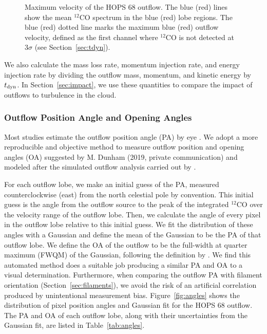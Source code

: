 \documentclass[twocolumn]{aastex63}
\newcommand{\example}{HOPS 68}
\newcommand{\co}[1][]{\ensuremath{^{#1}}CO}
\begin{document}
\begin{figure}
\caption{Maximum velocity of the \example{} outflow. The blue (red) lines show the mean \co[12]{} spectrum in the blue (red) lobe regions. The blue (red) dotted line marks the maximum blue (red) outflow velocity, defined as the first channel where \co[12]{} is not detected at $3\sigma$ (see Section~\ref{sec:tdyn}).\label{fig:vmax}}
\end{figure}

We also calculate the mass loss rate, momentum injection rate, and energy injection rate by dividing the outflow mass, momentum, and kinetic energy by $t_{\rm dyn}$. In Section~\ref{sec:impact}, we use these quantities to compare the impact of outflows to turbulence in the cloud.

\subsubsection{Outflow Position Angle and Opening Angles\label{sec:angles}}
Most studies estimate the outflow position angle (PA) by eye \citep[e.g.][]{Morgan91,Takahashi08,Plunkett13,Stephens17,Kong19,Tanabe:submitted}. We adopt a more reproducible and objective method to measure outflow position and opening angles (OA)  suggested by M. Dunham (2019, private communication) and modeled after the simulated outflow analysis carried out by \citet{Offner11}.

For each outflow lobe, we make an initial guess of the PA, measured counterclockwise (east) from the north celestial pole by convention. This initial guess is the angle from the outflow source to the peak of the integrated \co[12]{} over the velocity range of the outflow lobe. Then, we calculate the angle of every pixel in the outflow lobe relative to this initial guess. We fit the distribution of these angles with a Gaussian and define the mean of the Gaussian to be the PA of that outflow lobe. We define the OA of the outflow to be the full-width at quarter maximum (FWQM) of the Gaussian, following the definition by \cite{Offner11}. We find this automated method does a suitable job producing a similar PA and OA to a visual determination. Furthermore, when comparing the outflow PA with filament orientation (Section~\ref{sec:filaments}), we avoid the risk of an artificial correlation produced by unintentional measurement bias. Figure~\ref{fig:angles} shows the distribution of pixel position angles and Gaussian fit for the \example{} outflow. The PA and OA of each outflow lobe, along with their uncertainties from the Gaussian fit, are listed in Table~\ref{tab:angles}.
\end{document}

